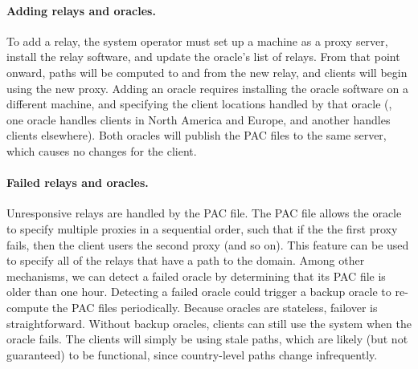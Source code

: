 \paragraph{Adding relays and oracles.} To add a relay, the system
operator must set up a machine as a proxy server, install the relay
software, and update the oracle's list of relays.  From that point
onward, paths will be computed to and from the new relay, and clients
will begin using the new proxy.  Adding an oracle requires installing
the oracle software on a different machine, and specifying the client
locations handled by that oracle (\eg, one oracle handles clients in
North America and Europe, and another handles clients elsewhere).
Both oracles will publish the PAC files to the same server, which
causes no changes for the client.

\paragraph{Failed relays and oracles.} Unresponsive relays are handled
by the PAC file.  The PAC file allows the oracle to specify multiple
proxies in a sequential order, such that if the the first proxy fails,
then the client users the second proxy (and so on).  This feature can
be used to specify all of the relays that have a path to the domain.
Among other mechanisms, we can detect a failed oracle by determining
that its PAC file is older than one hour.  Detecting a failed oracle
could trigger a backup oracle to re-compute the PAC files
periodically.  Because oracles are stateless, failover is
straightforward.  Without backup oracles, clients can still use the
system when the oracle fails.  The clients will simply be using stale
paths, which are likely (but not guaranteed) to be functional, since
country-level paths change infrequently.

